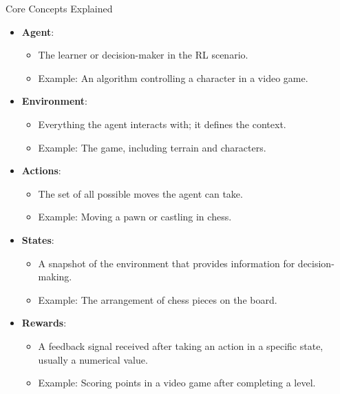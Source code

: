 \documentclass[aspectratio=169]{beamer}
\begin{document}
\begin{frame}{Core Concepts Explained}
    \begin{itemize}
        \item \textbf{Agent}:
          \begin{itemize}
              \item The learner or decision-maker in the RL scenario.
              \item Example: An algorithm controlling a character in a video game.
          \end{itemize}
          
        \item \textbf{Environment}:
          \begin{itemize}
              \item Everything the agent interacts with; it defines the context.
              \item Example: The game, including terrain and characters.
          \end{itemize}

        \item \textbf{Actions}:
          \begin{itemize}
              \item The set of all possible moves the agent can take.
              \item Example: Moving a pawn or castling in chess. 
          \end{itemize}

        \item \textbf{States}:
          \begin{itemize}
              \item A snapshot of the environment that provides information for decision-making.
              \item Example: The arrangement of chess pieces on the board.
          \end{itemize}

        \item \textbf{Rewards}:
          \begin{itemize}
              \item A feedback signal received after taking an action in a specific state, 
                usually a numerical value.
              \item Example: Scoring points in a video game after completing a level.
          \end{itemize}
    \end{itemize}
\end{frame}
\end{document}
